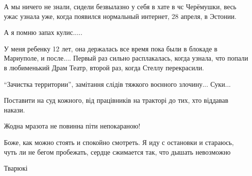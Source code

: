 
А мы ничего не знали, сидели безвылазно у себя в хате в чс Черёмушки, весь ужас
узнала уже, когда появился нормальный интернет, 28 апреля, в Эстонии.


А я помню запах кулис.....


У меня ребенку 12 лет, она держалась все время пока были в блокаде в Мариуполе, и
после.... Первый раз сильно расплакалась, когда узнала, что попали в любименький
Драм Театр, второй раз, когда Стеллу перекрасили.


\enquote{Зачистка территории}, замітання слідів тяжкого воєнного злочину... Суки...


Поставити на суд кожного, від працівників на тракторі до тих, хто віддавав накази.

Жодна мразота не повинна піти непокараною!


Боже, как можно стоять и спокойно смотреть. Я иду с остановки и стараюсь, чуть
ли не бегом пробежать, сердце сжимается так, что дышать невозможно


Тварюкі
